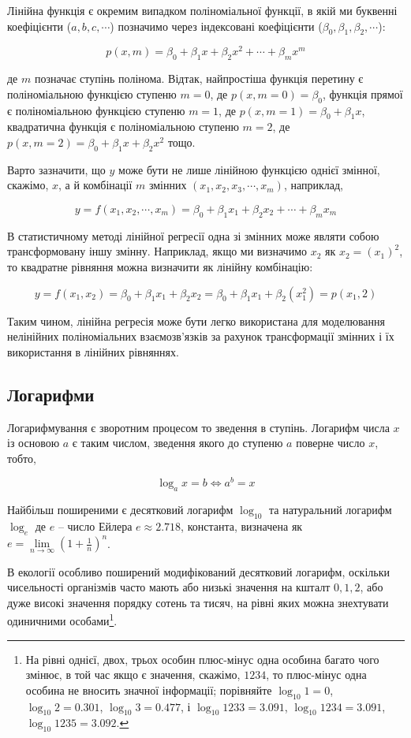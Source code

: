 \documentclass[
  11pt,
]{book}
\begin{document}
Лінійна функція є окремим випадком поліноміальної функції, в якій ми буквенні коефіцієнти (\(a, b, c, \cdots\)) позначимо через індексовані коефіцієнти (\(\beta_0, \beta_1, \beta_2, \cdots\)):

\[p(x, m) = \beta_0 + \beta_1 x + \beta_2 x^2 + \cdots + \beta_m x^m\]

де \(m\) позначає ступінь полінома. Відтак, найпростіша функція перетину є поліноміальною функцією ступеню \(m = 0\), де \(p(x, m = 0) = \beta_0\), функція прямої є поліноміальною функцією ступеню \(m = 1\), де \(p(x, m = 1) = \beta_0 + \beta_1 x\), квадратична функція є поліноміальною ступеню \(m = 2\), де \(p(x, m = 2) = \beta_0 + \beta_1 x + \beta_2 x^2\) тощо.

Варто зазначити, що \(y\) може бути не лише лінійною функцією однієї змінної, скажімо, \(x\), а й комбінації \(m\) змінних \((x_1, x_2, x_3, \cdots, x_m)\), наприклад,

\[y = f(x_1, x_2, \cdots, x_m) = \beta_0 + \beta_1 x_1 + \beta_2 x_2 + \cdots + \beta_m x_m\]

В статистичному методі лінійної регресії одна зі змінних може являти собою трансформовану іншу змінну. Наприклад, якщо ми визначимо \(x_2\) як \(x_2 = (x_1)^2\), то квадратне рівняння можна визначити як лінійну комбінацію:

\[y = f(x_1, x_2) = \beta_0 + \beta_1 x_1 + \beta_2 x_2 = \beta_0 + \beta_1 x_1 + \beta_2 (x_1^2) = p(x_1, 2)\]

Таким чином, лінійна регресія може бути легко використана для моделювання нелінійних поліноміальних взаємозв'язків за рахунок трансформації змінних і їх використання в лінійних рівняннях.

\subsection{Логарифми}\label{logs}

Логарифмування є зворотним процесом то зведення в ступінь. Логарифм числа \(x\) із основою \(a\) є таким числом, зведення якого до ступеню \(a\) поверне число \(x\), тобто,

\[\log_a x = b\iff a^b = x\]

Найбільш поширеними є десятковий логарифм \(\log_{10}\) та натуральний логарифм \(\log_e\) де \(e\) -- число Ейлера \(e \approx 2.718\), константа, визначена як \(e = \lim\limits_{n \rightarrow \infty} (1 + \frac{1}{n})^n\).

В екології особливо поширений модифікований десятковий логарифм, оскільки чисельності організмів часто мають або низькі значення на кшталт \(0, 1, 2\), або дуже високі значення порядку сотень та тисяч, на рівні яких можна знехтувати одиничними особами\footnote{На рівні однієї, двох, трьох особин плюс-мінус одна особина багато чого змінює, в той час якщо є значення, скажімо, \(1234\), то плюс-мінус одна особина не вносить значної інформації; порівняйте \(\log_{10} 1 = 0\), \(\log_{10} 2 = 0.301\), \(\log_{10} 3 = 0.477\), і \(\log_{10} 1233 = 3.091\), \(\log_{10} 1234 = 3.091\), \(\log_{10} 1235 = 3.092\).}.
\end{document}
